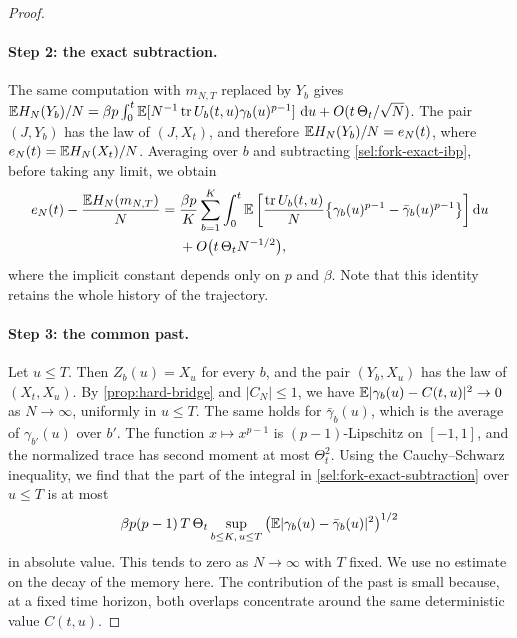 \begin{proof}
\paragraph{Step 2: the exact subtraction.}
The same computation with $m_{N,T}$ replaced by $Y_b$ gives
$\mathbb E H_N(Y_b)/N=\beta p\int_0^t\mathbb E[N^{-1}\operatorname{tr} U_b(t,u)\gamma_b(u)^{p-1}]\,\mathop{}\!\mathrm d u
+O(t\,\Theta_t/\sqrt N)$. The pair $(J,Y_b)$ has the law of $(J,X_t)$, and
therefore $\mathbb E H_N(Y_b)/N=e_N(t)$, where $e_N(t)=\mathbb E H_N(X_t)/N$. Averaging over $b$ and
subtracting \eqref{sel:fork-exact-ibp}, before taking any limit, we obtain
\begin{equation}\label{sel:fork-exact-subtraction}
\begin{aligned}
 e_N(t)-\frac{\mathbb E H_N(m_{N,T})}N
 ={}&\frac{\beta p}K\sum_{b=1}^K\int_0^t
 \mathbb E\left[\frac{\operatorname{tr} U_b(t,u)}N
 \big\{\gamma_b(u)^{p-1}-\bar\gamma_b(u)^{p-1}\big\}\right]\mathop{}\!\mathrm d u\\
 &+O\big(t\,\Theta_tN^{-1/2}\big),
\end{aligned}
\end{equation}
where the implicit constant depends only on $p$ and $\beta$.
Note that this identity retains the whole history of the trajectory.

\paragraph{Step 3: the common past.}
Let $u\le T$. Then $Z_b(u)=X_u$ for every $b$, and the pair $(Y_b,X_u)$ has
the law of $(X_t,X_u)$. By \cref{prop:hard-bridge} and $|C_N|\le1$, we
have $\mathbb E|\gamma_b(u)-C(t,u)|^2\to0$ as $N\to\infty$, uniformly in $u\le T$.
The same holds for $\bar\gamma_b(u)$, which is the average of
$\gamma_{b'}(u)$ over $b'$. The function $x\mapsto x^{p-1}$ is
$(p-1)$-Lipschitz on $[-1,1]$, and the normalized trace has second moment at most $\Theta_t^2$. Using the
Cauchy--Schwarz inequality, we find that the part of the integral in
\eqref{sel:fork-exact-subtraction} over $u\le T$ is at most
\[
 \beta p(p-1)\,T\,\Theta_t
 \sup_{b\le K,\,u\le T}\big(\mathbb E|\gamma_b(u)-\bar\gamma_b(u)|^2\big)^{1/2}
\]
in absolute value. This tends to zero as $N\to\infty$ with $T$ fixed. We
use no estimate on the decay of the memory here. The contribution of the
past is small because, at a fixed time horizon, both overlaps concentrate
around the same deterministic value $C(t,u)$.


\end{proof}
